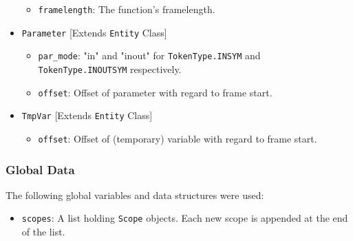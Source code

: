 \documentclass{article}
\def\code#1{\texttt{#1}} %
\begin{document}
\begin{itemize}
\begin{itemize}
    \item \code{framelength}: The function's framelength.
    \end{itemize}
  \item \code{Parameter} [Extends \code{Entity} Class]
    \begin{itemize}
    \item \code{par\_mode}: "in" and "inout" for \code{TokenType.INSYM} and \code{TokenType.INOUTSYM} respectively.
    \item \code{offset}: Offset of parameter with regard to frame start.
    \end{itemize}
  \item \code{TmpVar} [Extends \code{Entity} Class]
    \begin{itemize}
    \item \code{offset}: Offset of (temporary) variable with regard to frame start.
    \end{itemize}
\end{itemize}

\subsubsection{Global Data}
The following global variables and data structures were used:
\begin{itemize}
 \item \code{scopes}: A list holding \code{Scope} objects. Each new scope is appended at the end of the list.
\end{itemize}
\end{document}
